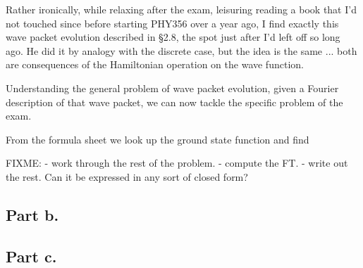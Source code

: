 Rather ironically, while relaxing after the exam, leisuring reading a book \cite{pauli2000wm} that I'd not touched since before starting PHY356 over a year ago, I find exactly this wave packet evolution described in \S 2.8, the spot just after I'd left off so long ago.  He did it by analogy with the discrete case, but the idea is the same ... both are consequences of the Hamiltonian operation on the wave function.

Understanding the general problem of wave packet evolution, given a Fourier description of that wave packet, we can now tackle the specific problem of the exam.

From the formula sheet we look up the ground state function and find

FIXME: 
- work through the rest of the problem.
	- compute the FT.
	- write out the rest.  Can it be expressed in any sort of closed form?

\subsection{Part b.}

\subsection{Part c.}


\EndArticle
